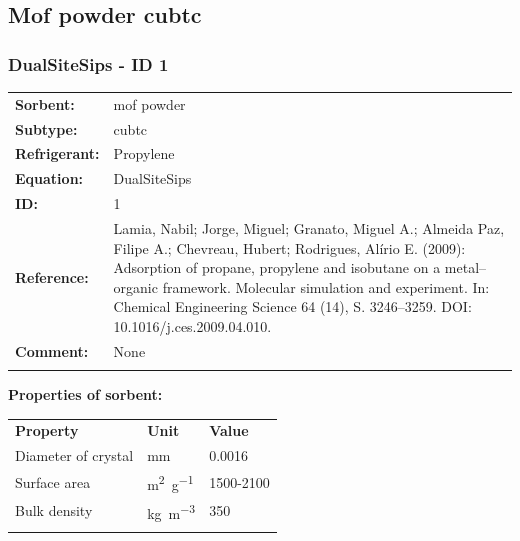 \subsection{Mof powder cubtc}
%
\subsubsection{DualSiteSips - ID 1}
%
\begin{tabular}[l]{|lp{11.5cm}|}
\hline
\addlinespace

\textbf{Sorbent:} & mof powder \\
\textbf{Subtype:} & cubtc \\
\textbf{Refrigerant:} & Propylene \\
\textbf{Equation:} & DualSiteSips \\
\textbf{ID:} & 1 \\
\textbf{Reference:} & Lamia, Nabil; Jorge, Miguel; Granato, Miguel A.; Almeida Paz, Filipe A.; Chevreau, Hubert; Rodrigues, Alírio E. (2009): Adsorption of propane, propylene and isobutane on a metal–organic framework. Molecular simulation and experiment. In: Chemical Engineering Science 64 (14), S. 3246–3259. DOI: 10.1016/j.ces.2009.04.010. \\
\textbf{Comment:} & None \\

\addlinespace
\hline
\end{tabular}
\newline

\textbf{Properties of sorbent:}
\newline
%
\begin{longtable}[l]{lll}
\toprule
\addlinespace
\textbf{Property} & \textbf{Unit} & \textbf{Value} \\
\addlinespace
\midrule
\endhead
\bottomrule
\endfoot
\bottomrule
\endlastfoot
\addlinespace

Diameter of crystal & \si{\milli\meter} & 0.0016\\
Surface area & \si{\square\meter\per\gram} & 1500-2100\\
Bulk density & \si{\kilogram\per\cubic\meter} & 350\\

\addlinespace\end{longtable}

